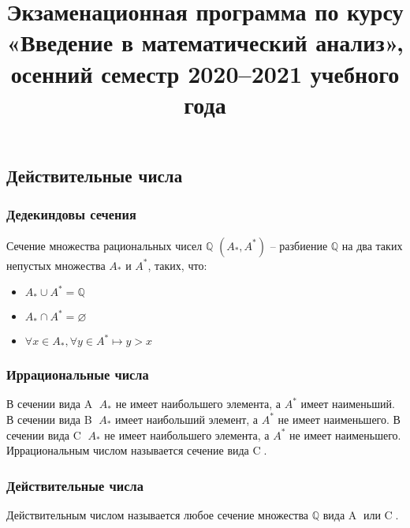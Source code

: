 \documentclass{article}
\title{Экзаменационная программа по курсу «Введение в математический анализ», осенний семестр 2020–2021 учебного года}
\date{}
\begin{document}
    \maketitle

    \newpage

    \onehalfspacing

    \setcounter{tocdepth}{3}
    \tableofcontents

    \newpage

    \section{}
    \subsection*{Действительные  числа}
        \subsubsection*{Дедекиндовы сечения}
        Сечение множества рациональных чисел $\mathbb{Q}$ $(A_*, A^*)$ -- разбиение $\mathbb{Q}$ на два таких непустых множества $A_*$ и $A^*$, таких, что:
        \begin{itemize}
            \item $A_* \cup A^* = \mathbb{Q}$
            \item $A_* \cap A^* = \varnothing$
            \item $\forall x \in A_*, \forall y \in A^* \longmapsto y > x$
        \end{itemize}
        \subsubsection*{Иррациональные числа}
        В сечении вида {\large \textcircled{\small A}} $A_*$ не имеет наибольшего элемента, а $A^*$ имеет наименьший.
        В сечении вида {\large \textcircled{\small B}} $A_*$ имеет наибольший элемент, а $A^*$ не имеет наименьшего.
        В сечении вида {\large \textcircled{\small C}} $A_*$ не имеет наибольшего элемента, а $A^*$ не имеет наименьшего.
        \\
        Иррациональным числом называется сечение вида \textcircled{C}.
        
        \subsubsection*{Действительные числа}
        Действительным числом называется любое сечение множества $\mathbb{Q}$ вида {\large \textcircled{\small A}} или {\large \textcircled{\small C}}.
        
\end{document}
